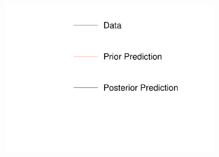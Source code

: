 \begin{figure}
\centering
\begin{subfigure}{.24\textwidth}
  \centering
  \includegraphics[width=\linewidth, clip]{figs/prior1dleg.pdf}
\end{subfigure}


\end{figure}
